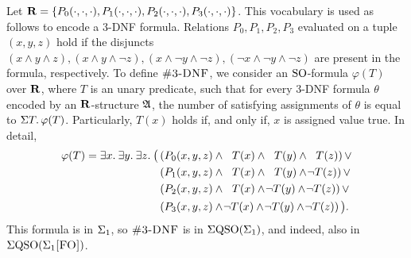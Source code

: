 
Let $\mathbf{R} = \{P_0(\cdot,\cdot,\cdot), P_1(\cdot,\cdot,\cdot), P_2(\cdot,\cdot,\cdot), P_3(\cdot,\cdot,\cdot)\}$. This vocabulary is used as follows to encode a 3-DNF formula. Relations $P_0,P_1,P_2,P_3$ evaluated on a tuple $(x,y,z)$ hold if the disjuncts $(x\wedge y \wedge z),(x\wedge y \wedge \neg z),(x\wedge \neg y \wedge \neg z),(\neg x\wedge\neg y \wedge\neg z)$ are present in the formula, respectively.
To define $\ctdnf$, we consider an ${\rm SO}$-formula $\varphi(T)$ over $\mathbf{R}$, where $T$ is an unary predicate, such that for every 3-DNF formula $\theta$ encoded by an $\mathbf{R}$-structure $\mathfrak{A}$, the number of satisfying assignments of $\theta$ is equal to $\Sigma{T}.\,\varphi(T)$. Particularly, $T(x)$ holds if, and only if, $x$ is assigned value true. In detail,
\begin{align*}
\varphi(T) = \exists{x}.\:\exists{y}.\:\exists{z}.\:\big(\,
&(P_0(x,y,z)\wedge \ \; T(x)\wedge \ \; T(y)\wedge \ \; T(z))\,\vee\\
&(P_1(x,y,z)\wedge \ \; T(x)\wedge \ \; T(y)\wedge \!\neg T(z))\,\vee\\
&(P_2(x,y,z)\wedge \ \; T(x)\wedge\!\neg T(y)\wedge \!\neg T(z))\,\vee\\
&(P_3(x,y,z)\wedge \!\neg T(x)\wedge \!\neg T(y)\wedge \!\neg T(z))\,\big).
\end{align*}
This formula is in $\Sigma_{1}$, so $\ctdnf$ is in $\Sigma{\rm QSO}(\Sigma_{1})$, and indeed, also in $\Sigma{\rm QSO}(\Sigma_{1}\textsc{[FO]})$. 

